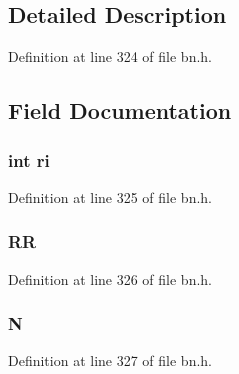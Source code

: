 \subsection{Detailed Description}


Definition at line 324 of file bn.\+h.



\subsection{Field Documentation}
\subsubsection[{\texorpdfstring{ri}{ri}}]{\setlength{\rightskip}{0pt plus 5cm}int ri}\hypertarget{structbn__mont__ctx__st_adefccf195553a86b78e30f79147bb619}{}\label{structbn__mont__ctx__st_adefccf195553a86b78e30f79147bb619}


Definition at line 325 of file bn.\+h.

\subsubsection[{\texorpdfstring{RR}{RR}}]{ RR}\hypertarget{structbn__mont__ctx__st_ad99ae4970cb39992572fc82ab7990fde}{}\label{structbn__mont__ctx__st_ad99ae4970cb39992572fc82ab7990fde}


Definition at line 326 of file bn.\+h.

\subsubsection[{\texorpdfstring{N}{N}}]{ N}\hypertarget{structbn__mont__ctx__st_ad0a9b4b193ae5312d7260bedd97090b9}{}\label{structbn__mont__ctx__st_ad0a9b4b193ae5312d7260bedd97090b9}


Definition at line 327 of file bn.\+h.

